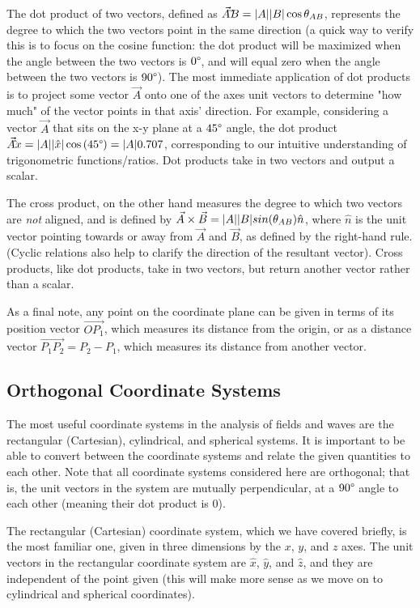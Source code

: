 \documentclass{article}
\begin{document}
The dot product of two vectors, defined as $\vec{A} \dot \vec{B} =|A|\space|B|\cos{\theta_{AB}}$, represents the degree to which the two vectors point in the same direction (a quick way to verify this is to focus on the cosine function: the dot product will be maximized when the angle between the two vectors is $0\degree$, and will equal zero when the angle between the two vectors is $90\degree$). The most immediate application of dot products is to project some vector $\vec{A}$ onto one of the axes unit vectors to determine "how much" of the vector points in that axis' direction. For example, considering a vector $\vec{A}$ that sits on the x-y plane at a $45\degree$ angle, the dot product $\vec{A} \dot \hat{x} = |A|\space|\hat{x}|\cos{(45\degree)} = |A|\space 0.707$, corresponding to our intuitive understanding of trigonometric functions/ratios. Dot products take in two vectors and output a scalar.

The cross product, on the other hand measures the degree to which two vectors are \textit{not} aligned, and is defined by $\vec{A} \times \vec{B} = |A|\space|B|sin(\theta_{AB})\hat{n}$, where $\hat{n}$ is the unit vector pointing towards or away from $\vec{A}$ and $\vec{B}$, as defined by the right-hand rule. (Cyclic relations also help to clarify the direction of the resultant vector). Cross products, like dot products, take in two vectors, but return another vector rather than a scalar.

As a final note, any point on the coordinate plane can be given in terms of its position vector $\vec{OP_1}$, which measures its distance from the origin, or as a distance vector $\vec{P_1P_2} = {P_2 - P_1}$, which measures its distance from another vector.

\subsection{Orthogonal Coordinate Systems}
The most useful coordinate systems in the analysis of fields and waves are the rectangular (Cartesian), cylindrical, and spherical systems. It is important to be able to convert between the coordinate systems and relate the given quantities to each other. Note that all coordinate systems considered here are orthogonal; that is, the unit vectors in the system are mutually perpendicular, at a $90\degree$ angle to each other (meaning their dot product is $0$).

The rectangular (Cartesian) coordinate system, which we have covered briefly, is the most familiar one, given in three dimensions by the $x$, $y$, and $z$ axes. The unit vectors in the rectangular coordinate system are $\hat{x}$, $\hat{y}$, and $\hat{z}$, and they are independent of the point given (this will make more sense as we move on to cylindrical and spherical coordinates). 
\end{document}
